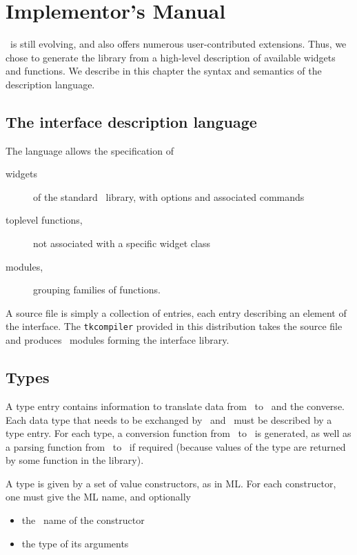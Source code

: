 \chapter{Implementor's Manual}
\label{chap:impl}
\tk\ is still evolving, and also offers numerous user-contributed
extensions. Thus, we chose to generate the library from a high-level
description of available widgets and functions. 
We describe in this chapter
the syntax and semantics of the description language.

\section{The interface description language}
The language allows the specification of
\begin{description}
\item[widgets] of the standard \tk\ library, with options and associated commands
\item[toplevel functions,] not associated with a specific widget class
\item[modules,] grouping families of functions.
\end{description} 

A source file is simply a collection of entries, each entry describing an
element of the interface. The {\tt tkcompiler} provided in this distribution
takes the source file and produces \caml\ modules forming the interface
library.

\section{Types}
A type entry contains information to translate data from \caml\ to \tk\ 
and the converse. Each data type that needs to be exchanged by \caml\ and
\tk\ must be described by a type entry. For each type, a conversion function
from \caml\ to \tk\ is generated, as well as a parsing function from \tk\ to
\caml\ if required (because values of the type are returned by some
function in the library).

A type is given by a set of value constructors, as in ML. For each
constructor, one must give the ML name, and optionally
\begin{itemize}
\item the \tk\ name of the constructor
\item the type of its arguments
\end{itemize} 

